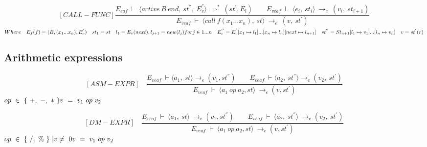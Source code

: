 \[
[CALL-FUNC]
\dfrac{E_{eaf} \ \vdash \ \langle active \ B \ end, \ st^{''}, \ E_v^{''} \rangle \ \Rightarrow^{*} \ (st^{'}, E_l) \qquad E_{veaf} \ \vdash \ \langle e_i, \ st_i \rangle \ \rightarrow_e \ (v_i, \ st_{i+1})}{E_{veaf} \ \vdash \ \langle call \ f(x_1 ... x_n), \ st \rangle \ \rightarrow_e \ (v, \ st^{'})}
\]
\begin{math}
	Where
	\quad E_f(f) = (B, (x_1 ... x_n), E_v^{'}) \newline
	\quad st_1 = st \newline
	\quad l_1 = E_v(next), l_{j+1} = new(l_j) for j \in {1 ... n} \newline
	\quad E_v^{''} = E_v^{'}[x_1 \mapsto l_1] ... [x_n \mapsto l_n][next \mapsto l_{n+1}] \newline
	\quad st^{''} = St_{n+1}[l_1 \mapsto v_1] ... [l_n \mapsto v_n] \newline
	\quad v = st^{'}(r)
\end{math}

\subsection{Arithmetic expressions}
\[
[ASM-EXPR] \quad	
\dfrac{E_{veaf} \ \vdash \langle a_1, \ st \rangle \rightarrow_{e} (v_1, st^{''}) \qquad E_{veaf} \ \vdash \langle a_2, \ st^{''}\rangle \rightarrow_e (v_2, \ st^{'})}{E_{veaf} \ \vdash \ \langle a_1 \ op \ a_2, st \rangle \ \rightarrow_{e} (v, st^{'})}	
\]
\begin{math}		
op \ \in \ \{ \ +, \ -, \ * \ \} \newline		
v \ = \ v_1 \ op \ v_2		
\end{math}

\[
[DM-EXPR] \quad
\dfrac{E_{veaf} \ \vdash \ \langle a_1, \ st \rangle \ \rightarrow_{e} (v_1, st^{''}) \qquad E_{veaf} \ \vdash \ \langle a_2, \ st^{''} \rangle \ \rightarrow_e (v_2, \ st^{'})}{E_{veaf} \ \vdash \ \langle a_1 \ op \ a_2, st \rangle \ \rightarrow_{e} (v, st^{'})}	
\]
\begin{math}		
op \ \in \ \{ \ /, \ \% \ \} \ | v \not= \ 0 \newline 		
v \ = \ v_1 \ op \ v_2		
\end{math} 

